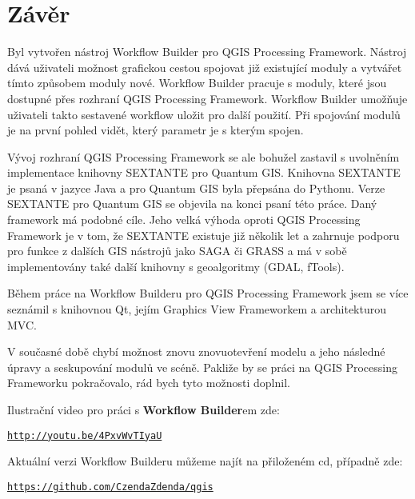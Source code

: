 \chapter*{Závěr}
Byl vytvořen nástroj Workflow Builder pro QGIS Processing Framework. Nástroj dává uživateli možnost  grafickou cestou spojovat již existující moduly a vytvářet tímto způsobem moduly nové. Workflow Builder pracuje s moduly, které jsou dostupné přes rozhraní QGIS Processing Framework. Workflow Builder umožňuje uživateli takto sestavené workflow uložit pro další použití. Při spojování modulů je na první pohled vidět, který parametr je s kterým spojen.

Vývoj rozhraní QGIS Processing Framework se ale bohužel zastavil s uvolněním implementace knihovny SEXTANTE pro Quantum GIS. Knihovna SEXTANTE je psaná v jazyce Java a pro Quantum GIS byla přepsána do Pythonu. Verze {SEXTANTE} pro Quantum GIS se objevila na konci psaní této práce. Daný framework má podobné cíle. Jeho velká výhoda oproti QGIS Processing Framework je v tom, že SEXTANTE existuje již několik let a zahrnuje podporu pro funkce z dalších GIS nástrojů jako SAGA či GRASS a má v sobě implementovány také další knihovny s geoalgoritmy (GDAL, fTools).

Během práce na Workflow Builderu pro QGIS Processing Framework jsem se více seznámil s knihovnou Qt, jejím Graphics View Frameworkem a architekturou MVC. 

V současné době chybí možnost znovu znovuotevření modelu a jeho následné úpravy a seskupování modulů ve scéně. Pakliže by se práci na QGIS Processing Frameworku pokračovalo, rád bych tyto možnosti doplnil.

Ilustrační video pro práci s \textbf{Workflow Builder}em zde:

\begin{center}
	\href{http://youtu.be/4PxvWvTIyaU}{\texttt{http://youtu.be/4PxvWvTIyaU}}
\end{center}
 
\newpage
Aktuální verzi Workflow Builderu můžeme najít na přiloženém cd, případně zde:

\begin{center}
	\href{https://github.com/CzendaZdenda/qgis}{\texttt{https://github.com/CzendaZdenda/qgis}}
\end{center}